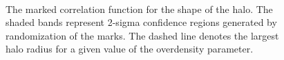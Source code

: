 \documentclass[usenatbib,usegraphicx,letterpaper]{mn2e}
\begin{document}
\begin{figure}
	\centering
	\\
	\caption{The marked correlation function for the shape of the halo. The shaded bands represent 2-sigma confidence regions generated by randomization of the marks. The dashed line denotes the largest halo radius for a given value of the overdensity parameter.}
\end{figure}
\end{document}
